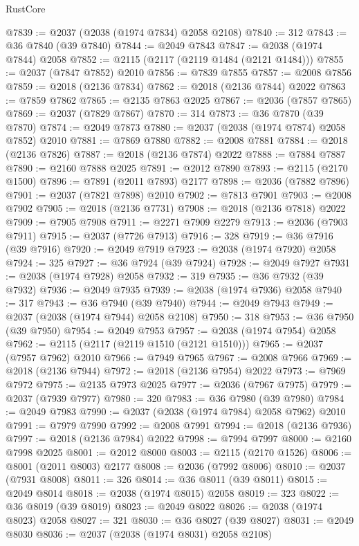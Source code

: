\begin{lexlean}{RustCore}
\begin{coremodule}
@7839 := @2037 (@2038 (@1974 @7834) @2058 @2108)
@7840 := 312
@7843 := @36 @7840 (@39 @7840)
@7844 := @2049 @7843
@7847 := @2038 (@1974 @7844) @2058
@7852 := @2115 (@2117 (@2119 @1484 (@2121 @1484)))
@7855 := @2037 (@7847 @7852) @2010
@7856 := @7839 @7855
@7857 := @2008 @7856
@7859 := @2018 (@2136 @7834)
@7862 := @2018 (@2136 @7844) @2022
@7863 := @7859 @7862
@7865 := @2135 @7863 @2025
@7867 := @2036 (@7857 @7865)
@7869 := @2037 (@7829 @7867)
@7870 := 314
@7873 := @36 @7870 (@39 @7870)
@7874 := @2049 @7873
@7880 := @2037 (@2038 (@1974 @7874) @2058 @7852) @2010
@7881 := @7869 @7880
@7882 := @2008 @7881
@7884 := @2018 (@2136 @7826)
@7887 := @2018 (@2136 @7874) @2022
@7888 := @7884 @7887
@7890 := @2160 @7888 @2025
@7891 := @2012 @7890
@7893 := @2115 (@2170 @1500)
@7896 := @7891 (@2011 @7893) @2177
@7898 := @2036 (@7882 @7896)
@7901 := @2037 (@7821 @7898) @2010
@7902 := @7813 @7901
@7903 := @2008 @7902
@7905 := @2018 (@2136 @7731)
@7908 := @2018 (@2136 @7818) @2022
@7909 := @7905 @7908
@7911 := @2271 @7909 @2279
@7913 := @2036 (@7903 @7911)
@7915 := @2037 (@7726 @7913)
@7916 := 328
@7919 := @36 @7916 (@39 @7916)
@7920 := @2049 @7919
@7923 := @2038 (@1974 @7920) @2058
@7924 := 325
@7927 := @36 @7924 (@39 @7924)
@7928 := @2049 @7927
@7931 := @2038 (@1974 @7928) @2058
@7932 := 319
@7935 := @36 @7932 (@39 @7932)
@7936 := @2049 @7935
@7939 := @2038 (@1974 @7936) @2058
@7940 := 317
@7943 := @36 @7940 (@39 @7940)
@7944 := @2049 @7943
@7949 := @2037 (@2038 (@1974 @7944) @2058 @2108)
@7950 := 318
@7953 := @36 @7950 (@39 @7950)
@7954 := @2049 @7953
@7957 := @2038 (@1974 @7954) @2058
@7962 := @2115 (@2117 (@2119 @1510 (@2121 @1510)))
@7965 := @2037 (@7957 @7962) @2010
@7966 := @7949 @7965
@7967 := @2008 @7966
@7969 := @2018 (@2136 @7944)
@7972 := @2018 (@2136 @7954) @2022
@7973 := @7969 @7972
@7975 := @2135 @7973 @2025
@7977 := @2036 (@7967 @7975)
@7979 := @2037 (@7939 @7977)
@7980 := 320
@7983 := @36 @7980 (@39 @7980)
@7984 := @2049 @7983
@7990 := @2037 (@2038 (@1974 @7984) @2058 @7962) @2010
@7991 := @7979 @7990
@7992 := @2008 @7991
@7994 := @2018 (@2136 @7936)
@7997 := @2018 (@2136 @7984) @2022
@7998 := @7994 @7997
@8000 := @2160 @7998 @2025
@8001 := @2012 @8000
@8003 := @2115 (@2170 @1526)
@8006 := @8001 (@2011 @8003) @2177
@8008 := @2036 (@7992 @8006)
@8010 := @2037 (@7931 @8008)
@8011 := 326
@8014 := @36 @8011 (@39 @8011)
@8015 := @2049 @8014
@8018 := @2038 (@1974 @8015) @2058
@8019 := 323
@8022 := @36 @8019 (@39 @8019)
@8023 := @2049 @8022
@8026 := @2038 (@1974 @8023) @2058
@8027 := 321
@8030 := @36 @8027 (@39 @8027)
@8031 := @2049 @8030
@8036 := @2037 (@2038 (@1974 @8031) @2058 @2108)

\end{coremodule}
\end{lexlean}
